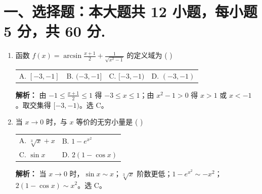 \documentclass[10pt, a3paper, landscape, twocolumn]{article}
\begin{document}
\section*{一、选择题：本大题共 12 小题，每小题 5 分，共 60 分.}

\begin{enumerate}
    \item 函数 $f(x) = \arcsin \frac{x+1}{2} + \frac{1}{\sqrt{x^2-1}}$ 的定义域为 ( \quad ) \\
    \begin{tabularx}{\linewidth}{@{} *{4}{X} @{}}
        A. $[-3,-1]$ & B. $(-3,-1]$ & C. $[-3,-1)$ & D. $(-3,-1)$
    \end{tabularx}
    {\color{red} \footnotesize \textbf{解析：} 由 $-1 \le \frac{x+1}{2} \le 1$ 得 $-3 \le x \le 1$；由 $x^2-1 > 0$ 得 $x>1$ 或 $x<-1$。取交集得 $[-3, -1)$。选 C。}

    \item 当 $x \to 0$ 时，与 $x$ 等价的无穷小量是 ( \quad ) \\
    \begin{tabularx}{\linewidth}{@{} *{2}{X} @{}}
        A. $\sqrt[3]{x} + x$ & B. $1 - e^{x^2}$ \\
        C. $\sin x$        & D. $2(1-\cos x)$
    \end{tabularx}
    {\color{red} \footnotesize \textbf{解析：} 当 $x \to 0$ 时，$\sin x \sim x$；$\sqrt[3]{x}$ 阶数更低；$1-e^{x^2} \sim -x^2$；$2(1-\cos x) \sim x^2$。选 C。}


\end{enumerate}
\end{document}
